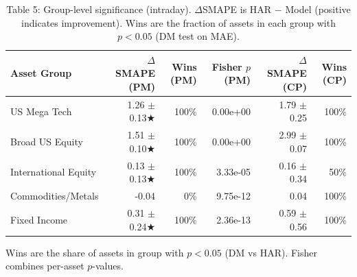 \begin{table}[t]
\centering
\caption{Table 5: Group-level significance (intraday). $\Delta$SMAPE is HAR $-$ Model (positive indicates improvement). Wins are the fraction of assets in each group with $p<0.05$ (DM test on MAE).}
\label{tab:groups}
\begin{tabular}{l r r r r r}
\toprule
Asset Group & $\Delta$SMAPE (PM) & Wins (PM) & Fisher $p$ (PM) & $\Delta$SMAPE (CP) & Wins (CP) \\
\midrule
US Mega Tech & 1.26 $\pm$ 0.13★ & 100\% & 0.00e+00 & 1.79 $\pm$ 0.25 & 100\% \\
Broad US Equity & 1.51 $\pm$ 0.10★ & 100\% & 0.00e+00 & 2.99 $\pm$ 0.07 & 100\% \\
International Equity & 0.13 $\pm$ 0.13★ & 100\% & 3.33e-05 & 0.16 $\pm$ 0.34 & 50\% \\
Commodities/Metals & -0.04 & 0\% & 9.75e-12 & 0.04 & 100\% \\
Fixed Income & 0.31 $\pm$ 0.24★ & 100\% & 2.36e-13 & 0.59 $\pm$ 0.56 & 100\% \\
\bottomrule
\end{tabular}
\vspace{2pt}
\footnotesize{Wins are the share of assets in group with $p<0.05$ (DM vs HAR). Fisher combines per-asset $p$-values.}
\end{table}